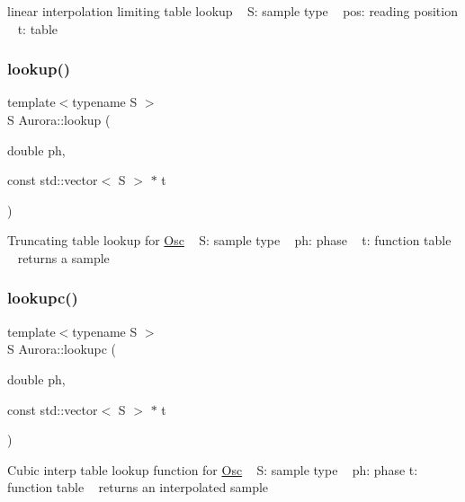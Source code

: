 linear interpolation limiting table lookup ~\newline
S\+: sample type ~\newline
pos\+: reading position ~\newline
t\+: table \mbox{\label{namespace_aurora_ae0082f7bc3946a88145d54bacd0c6ff3}} 
\subsubsection{\texorpdfstring{lookup()}{lookup()}}
{\footnotesize\ttfamily template$<$typename S $>$ \\
S Aurora\+::lookup (\begin{DoxyParamCaption}\item[{double}]{ph,  }\item[{const std\+::vector$<$ S $>$ $\ast$}]{t }\end{DoxyParamCaption})\hspace{0.3cm}{\ttfamily [inline]}}

Truncating table lookup for \hyperlink{class_aurora_1_1_osc}{Osc} ~\newline
S\+: sample type ~\newline
ph\+: phase ~\newline
t\+: function table ~\newline
returns a sample \mbox{\label{namespace_aurora_afab81d7b8873e7850073124fcf37eeea}} 
\subsubsection{\texorpdfstring{lookupc()}{lookupc()}}
{\footnotesize\ttfamily template$<$typename S $>$ \\
S Aurora\+::lookupc (\begin{DoxyParamCaption}\item[{double}]{ph,  }\item[{const std\+::vector$<$ S $>$ $\ast$}]{t }\end{DoxyParamCaption})\hspace{0.3cm}{\ttfamily [inline]}}

Cubic interp table lookup function for \hyperlink{class_aurora_1_1_osc}{Osc} ~\newline
S\+: sample type ~\newline
ph\+: phase  t\+: function table ~\newline
returns an interpolated sample \mbox{\label{namespace_aurora_a9246ac499667da52a0d1750e5238c4a8}} 
